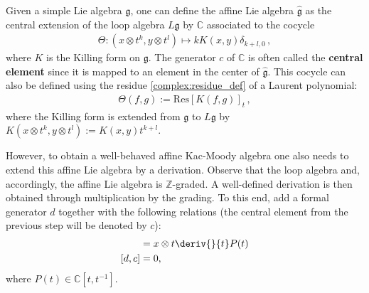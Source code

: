     \begin{definition}
        Given a simple Lie algebra $\mathfrak{g}$, one can define the affine Lie algebra $\widehat{\mathfrak{g}}$ as the central extension of the loop algebra $L\mathfrak{g}$ by $\mathbb{C}$ associated to the cocycle
        \begin{gather}
            \Theta:(x\otimes t^k,y\otimes t^l)\mapsto kK(x,y)\delta_{k+l,0}\,,
        \end{gather}
        where $K$ is the Killing form on $\mathfrak{g}$. The generator $c$ of $\mathbb{C}$ is often called the \textbf{central element} since it is mapped to an element in the center of $\widehat{\mathfrak{g}}$. This cocycle can also be defined using the residue \ref{complex:residue_def} of a Laurent polynomial:
        \begin{gather}
            \Theta(f,g) := \mathrm{Res}\left[K(f,g)\right]_t\,,
        \end{gather}
        where the Killing form is extended from $\mathfrak{g}$ to $L\mathfrak{g}$ by $K(x\otimes t^k,y\otimes t^l):=K(x,y)t^{k+l}$.

        However, to obtain a well-behaved affine Kac-Moody algebra one also needs to extend this affine Lie algebra by a derivation. Observe that the loop algebra and, accordingly, the affine Lie algebra is $\mathbb{Z}$-graded. A well-defined derivation is then obtained through multiplication by the grading. To this end, add a formal generator $d$ together with the following relations (the central element from the previous step will be denoted by $c$):
        \begin{align}
            [d,x\otimes P(t)] &= x\otimes t\deriv{}{t}P(t)\\
            [d,c] &= 0,
        \end{align}
        where $P(t)\in\mathbb{C}[t,t^{-1}]$.
    \end{definition}

